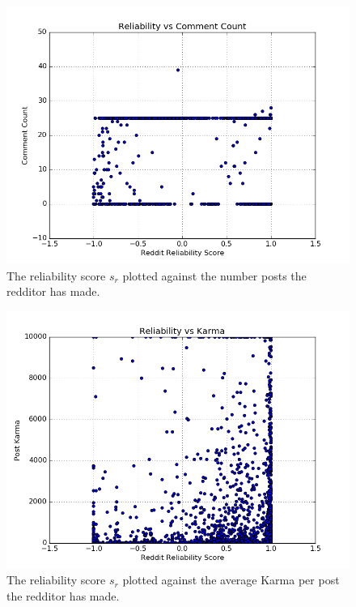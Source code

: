 \begin{figure}[tb]
    \centering
    \includegraphics[width=\linewidth]{figures/reliability_comment_count.png}
    \caption{The reliability score $s_r$ plotted against the number posts the redditor has made.}
    \label{fig:reliability_comment_count}
\end{figure}

\begin{figure}[tb]
    \centering
    \includegraphics[width=\linewidth]{figures/reliability_post_karma.png}
    \caption{The reliability score $s_r$ plotted against the average Karma per post the redditor has made.}
    \label{fig:reliability_post_karma}
\end{figure}

